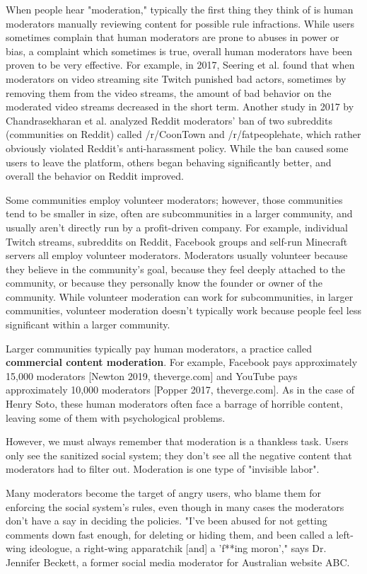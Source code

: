 \documentclass[class=book, crop=false]{standalone}
\providecommand{\keyterm}[1]{\textbf{#1}\marginnote{\scriptsize \textbf{#1}}}
\begin{document}
When people hear "moderation," typically the first thing they think of is human moderators manually reviewing content for possible rule infractions. While users sometimes complain that human moderators are prone to abuses in power or bias, a complaint which sometimes is true, overall human moderators have been proven to be very effective. For example, in 2017, Seering et al. found that when moderators on video streaming site Twitch punished bad actors, sometimes by removing them from the video streams, the amount of bad behavior on the moderated video streams decreased in the short term. Another study in 2017 by Chandrasekharan et al. analyzed Reddit moderators' ban of two subreddits (communities on Reddit) called /r/CoonTown and /r/fatpeoplehate, which rather obviously violated Reddit's anti-harassment policy. While the ban caused some users to leave the platform, others began behaving significantly better, and overall the behavior on Reddit improved.

Some communities employ volunteer moderators; however, those communities tend to be smaller in size, often are subcommunities in a larger community, and usually aren't directly run by a profit-driven company. For example, individual Twitch streams, subreddits on Reddit, Facebook groups and self-run Minecraft servers all employ volunteer moderators. Moderators usually volunteer because they believe in the community's goal, because they feel deeply attached to the community, or because they personally know the founder or owner of the community. While volunteer moderation can work for subcommunities, in larger communities, volunteer moderation doesn't typically work because people feel less significant within a larger community.

Larger communities typically pay human moderators, a practice called \keyterm{commercial content moderation}. For example, Facebook pays approximately 15,000 moderators [Newton 2019, theverge.com] and YouTube pays approximately 10,000 moderators [Popper 2017, theverge.com]. As in the case of Henry Soto, these human moderators often face a barrage of horrible content, leaving some of them with psychological problems.

However, we must always remember that moderation is a thankless task. Users only see the sanitized social system; they don't see all the negative content that moderators had to filter out. Moderation is one type of "invisible labor".

Many moderators become the target of angry users, who blame them for enforcing the social system's rules, even though in many cases the moderators don't have a say in deciding the policies. "I've been abused for not getting comments down fast enough, for deleting or hiding them, and been called a left-wing ideologue, a right-wing apparatchik [and] a 'f**ing moron'," says Dr. Jennifer Beckett, a former social media moderator for Australian website ABC.
\end{document}
